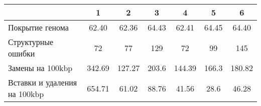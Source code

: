 \begin{adjustbox}{center}
\begin{tabular}{|l||c|c|c|c|c|c|}
\hline
& 1 & 2 & 3 & 4 & 5 & 6 \\
\hline
\hline
Покрытие генома & \cellcolor[RGB]{252, 232, 232} 62.40 & \cellcolor[RGB]{252, 232, 232} 62.36 & \cellcolor[RGB]{232, 232, 252} 64.43 & \cellcolor[RGB]{252, 232, 232} 62.41 & \cellcolor[RGB]{232, 232, 252} 64.45 & \cellcolor[RGB]{232, 232, 252} 64.40 \\
\hline
Структурные ошибки & \cellcolor[RGB]{227, 227, 252} 72 & \cellcolor[RGB]{237, 237, 253} 77 & \cellcolor[RGB]{247, 182, 182} 129 & \cellcolor[RGB]{227, 227, 252} 72 & \cellcolor[RGB]{253, 237, 237} 99 & \cellcolor[RGB]{235, 71, 71} 145 \\
\hline
Замены на 100kbp & \cellcolor[RGB]{235, 71, 71} 342.69 & \cellcolor[RGB]{205, 205, 249} 127.27 & \cellcolor[RGB]{250, 209, 209} 203.6 & \cellcolor[RGB]{223, 223, 251} 144.39 & \cellcolor[RGB]{246, 246, 254} 166.3 & \cellcolor[RGB]{254, 246, 246} 180.82 \\
\hline
Вставки и удаления на 100kbp & \cellcolor[RGB]{235, 71, 71} 654.71 & \cellcolor[RGB]{253, 237, 237} 61.02 & \cellcolor[RGB]{245, 168, 168} 88.76 & \cellcolor[RGB]{227, 227, 252} 41.56 & \cellcolor[RGB]{200, 200, 249} 28.6 & \cellcolor[RGB]{237, 237, 253} 46.28 \\
\hline
\end{tabular}
\end{adjustbox}
